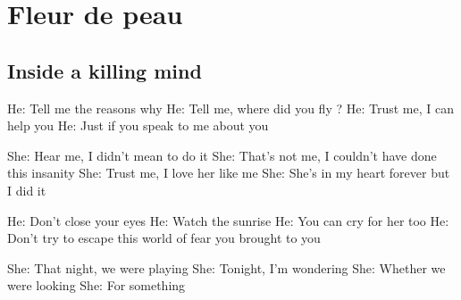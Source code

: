 \documentclass{article}
\newenvironment{album}[1]%
{%
  \section*{#1}
}%
{%
}
\newenvironment{song}[1]%
{%
  \subsection*{\textbf{#1}}
  \begin{multicols*}{2}
}%
{%
  \end{multicols*}
  \newpage
}
\newenvironment{couplet} %
{%
  \verbatim
}%
{% end code
  \endverbatim
}
\newenvironment{refrain} %
{%
  \verbatim
}%
{% end code
  \endverbatim
}
\begin{document}
\begin{album}{Fleur de peau}
\begin{song}{Inside a killing mind}
\begin{couplet}
He: Tell me the reasons why
He: Tell me, where did you fly ?
He: Trust me, I can help you
He: Just if you speak to me about you
\end{couplet}
\begin{couplet}
She: Hear me, I didn’t mean to do it
She: That’s not me, I couldn’t have done this insanity
She: Trust me, I love her like me
She: She’s in my heart forever but I did it
\end{couplet}
\begin{refrain}
He: Don’t close your eyes
He: Watch the sunrise
He: You can cry for her too
He: Don’t try to escape this world of fear you brought to you
\end{refrain}
\begin{couplet}
She: That night, we were playing
She: Tonight, I’m wondering
She: Whether we were looking
She: For something
\end{couplet}

\end{song}
\end{album}
\end{document}
